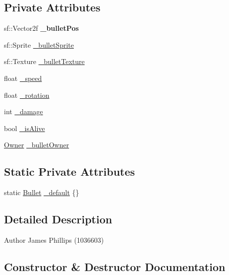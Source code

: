 \subsection*{Private Attributes}
\begin{DoxyCompactItemize}
\item 
\mbox{\label{class_bullet_a5889ed15f47debd2914c39f2dc71ec35}} 
sf\+::\+Vector2f {\bfseries \+\_\+bullet\+Pos}
\item 
sf\+::\+Sprite \hyperlink{class_bullet_a02a711293bc8bb2e8c7107811071c2e3}{\+\_\+bullet\+Sprite}
\item 
sf\+::\+Texture \hyperlink{class_bullet_ab75a648ee856f991a724499d1b8756fc}{\+\_\+bullet\+Texture}
\item 
float \hyperlink{class_bullet_a6a971a89bb69a7e9d5be0955e78d12a5}{\+\_\+speed}
\item 
float \hyperlink{class_bullet_a1904e460221accb69ae194fc4eb7d54f}{\+\_\+rotation}
\item 
int \hyperlink{class_bullet_a9b7eeafe7ca0e007f22e88ed39c04f34}{\+\_\+damage}
\item 
bool \hyperlink{class_bullet_a493d2187e18321e4777e3681c5ee07a6}{\+\_\+is\+Alive}
\item 
\hyperlink{_bullet_8h_a3b5e9e55eb7b08d5702a101e529e5507}{Owner} \hyperlink{class_bullet_af9fd5bbfc7e4e6a5a0f7e5af45360309}{\+\_\+bullet\+Owner}
\end{DoxyCompactItemize}
\subsection*{Static Private Attributes}
\begin{DoxyCompactItemize}
\item 
static \hyperlink{class_bullet}{Bullet} \hyperlink{class_bullet_a3a4b2ab27b25f04a30d3fc39e4a3b014}{\+\_\+default} \{\}
\end{DoxyCompactItemize}


\subsection{Detailed Description}
\begin{DoxyAuthor}{Author}
James Phillips (1036603) 
\end{DoxyAuthor}


\subsection{Constructor \& Destructor Documentation}
\mbox{\label{class_bullet_a751da85d043013c509426b6cf33bd9c5}} 
